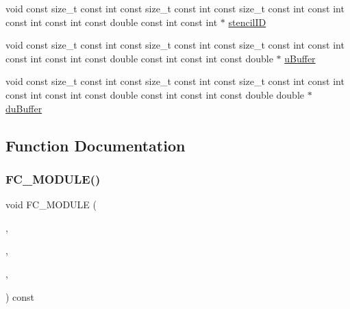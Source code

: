 \begin{DoxyCompactItemize}
\item 
void const size\+\_\+t const int const size\+\_\+t const int const size\+\_\+t const int const int const int const int const double const int const int $\ast$ \hyperlink{OperatorKernels_8H_a681701e0402fff5dd66637c1c99e34aa}{stencil\+ID}
\item 
void const size\+\_\+t const int const size\+\_\+t const int const size\+\_\+t const int const int const int const int const double const int const int const double $\ast$ \hyperlink{OperatorKernels_8H_a4761677c378739f45400fb946cfcb8a8}{u\+Buffer}
\item 
void const size\+\_\+t const int const size\+\_\+t const int const size\+\_\+t const int const int const int const int const double const int const int const double double $\ast$ \hyperlink{OperatorKernels_8H_a2e2f904f0824d100dd90a25fdbab0bff}{du\+Buffer}
\end{DoxyCompactItemize}


\subsection{Function Documentation}
\hypertarget{OperatorKernels_8H_a26a2af44853f977c0fec7741c8f7b8dc}{}\label{OperatorKernels_8H_a26a2af44853f977c0fec7741c8f7b8dc} 
\subsubsection{\texorpdfstring{F\+C\+\_\+\+M\+O\+D\+U\+L\+E()}{FC\_MODULE()}\hspace{0.1cm}{\footnotesize\ttfamily [1/4]}}
{\footnotesize\ttfamily void F\+C\+\_\+\+M\+O\+D\+U\+LE (\begin{DoxyParamCaption}\item[{operators}]{,  }\item[{applyoperator}]{,  }\item[{O\+P\+E\+R\+A\+T\+O\+RS}]{,  }\item[{A\+P\+P\+L\+Y\+O\+P\+E\+R\+A\+T\+OR}]{ }\end{DoxyParamCaption}) const}

\hypertarget{OperatorKernels_8H_a6f445acada583d684481b35d1a560255}{}\label{OperatorKernels_8H_a6f445acada583d684481b35d1a560255} 
